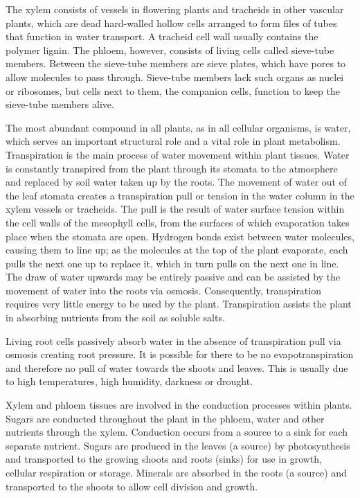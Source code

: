 The xylem consists of vessels in flowering plants and tracheids in other vascular plants, which are dead hard-walled hollow cells arranged to form files of tubes that function in water transport. A tracheid cell wall usually contains the polymer lignin. The phloem, however, consists of living cells called sieve-tube members. Between the sieve-tube members are sieve plates, which have pores to allow molecules to pass through. Sieve-tube members lack such organs as nuclei or ribosomes, but cells next to them, the companion cells, function to keep the sieve-tube members alive.

The most abundant compound in all plants, as in all cellular organisms, is water, which serves an important structural role and a vital role in plant metabolism. Transpiration is the main process of water movement within plant tissues. Water is constantly transpired from the plant through its stomata to the atmosphere and replaced by soil water taken up by the roots. The movement of water out of the leaf stomata creates a transpiration pull or tension in the water column in the xylem vessels or tracheids. The pull is the result of water surface tension within the cell walls of the mesophyll cells, from the surfaces of which evaporation takes place when the stomata are open. Hydrogen bonds exist between water molecules, causing them to line up; as the molecules at the top of the plant evaporate, each pulls the next one up to replace it, which in turn pulls on the next one in line. The draw of water upwards may be entirely passive and can be assisted by the movement of water into the roots via osmosis. Consequently, transpiration requires very little energy to be used by the plant. Transpiration assists the plant in absorbing nutrients from the soil as soluble salts.

Living root cells passively absorb water in the absence of transpiration pull via osmosis creating root pressure. It is possible for there to be no evapotranspiration and therefore no pull of water towards the shoots and leaves. This is usually due to high temperatures, high humidity, darkness or drought.

Xylem and phloem tissues are involved in the conduction processes within plants. Sugars are conducted throughout the plant in the phloem, water and other nutrients through the xylem. Conduction occurs from a source to a sink for each separate nutrient. Sugars are produced in the leaves (a source) by photosynthesis and transported to the growing shoots and roots (sinks) for use in growth, cellular respiration or storage. Minerals are absorbed in the roots (a source) and transported to the shoots to allow cell division and growth.

